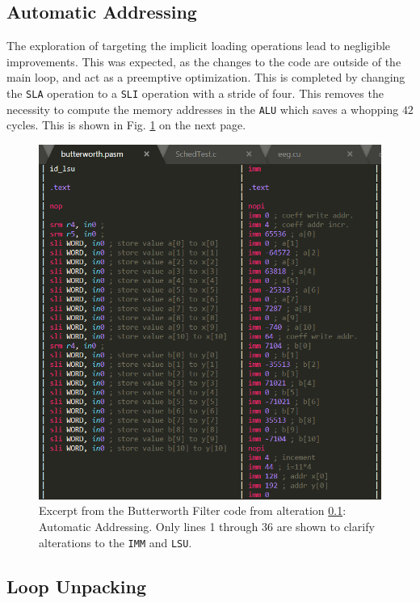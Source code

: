 \documentclass[letterpaper, 10 pt, conference]{ieeeconf}  %
\begin{document}
\subsection{Automatic Addressing}
\label{imp:C}

The exploration of targeting the implicit loading operations lead to negligible improvements. This was expected, as the changes to the code are outside of the main loop, and act as a preemptive optimization. This is completed by changing the \texttt{SLA} operation to a \texttt{SLI} operation with a stride of four. This removes the necessity to compute the memory addresses in the \texttt{ALU} which saves a whopping $42$ cycles. This is shown in Fig. \ref{fig:assem01} on the next page.

\begin{figure}[h!]
\begin{center}
\includegraphics[scale=0.35]{images/assem01.png}
\caption{Excerpt from the Butterworth Filter code from alteration \ref{imp:C}: Automatic Addressing. Only lines 1 through 36 are shown to clarify alterations to the \texttt{IMM} and \texttt{LSU}.}
\label{fig:assem01}
\end{center}
\end{figure}

\subsection{Loop Unpacking}
\label{imp:D}
\end{document}
